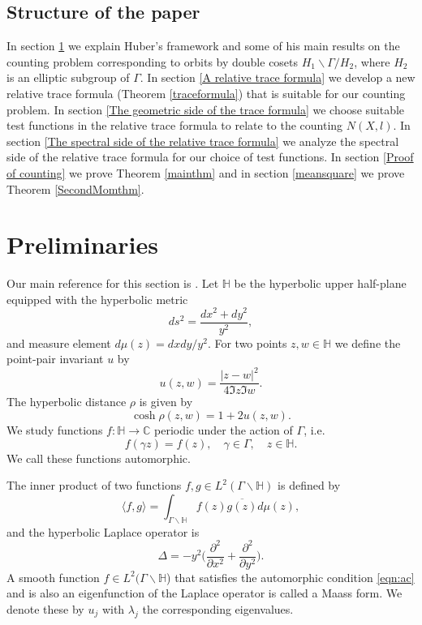\documentclass[a4paper,11pt]{amsart}
\theoremstyle{definition}
\begin{document}
\subsection{Structure of the paper}
In section \ref{Preliminaries} we explain Huber's framework and some of his main results on the counting problem corresponding to orbits by double cosets $H_1\backslash \Gamma /H_2$, where $H_2$ is an elliptic subgroup of $\Gamma$.
In section \ref{A relative trace formula} we develop a new relative trace formula (Theorem \ref{traceformula}) that is suitable for our counting problem.
In section \ref{The geometric side of the trace formula} we choose suitable test functions in the relative trace formula to relate to the counting $N(X,l)$.
In section \ref{The spectral side of the relative trace formula} we analyze the spectral side of the relative trace formula for our choice of test functions. In section \ref{Proof of counting} we prove Theorem \ref{mainthm} and in section \ref{meansquare} we prove Theorem \ref{SecondMomthm}. 

\section{Preliminaries}\label{Preliminaries}
Our main reference for this section is \cite{IW}. 
Let $\mathbb{H}$ be the hyperbolic upper half-plane 
equipped with the hyperbolic metric 
$$ds^2= \frac{dx^2+dy^2}{y^2},$$
and  measure element  
$d\mu(z)={dxdy}/{y^2}.$
For two points $z,w\in \mathbb{H}$ we define the point-pair invariant $u$ by
\begin{equation}\label{uzw}
    u(z,w)= \frac{|z-w|^2}{4\Im z\Im w}.
\end{equation}
The hyperbolic distance $\rho$ is given by
\begin{equation}\label{rho}
\cosh \rho(z,w) = 1+2u(z,w).
\end{equation}
We study functions $f : \mathbb{H} \rightarrow \mathbb{C}$ periodic under the action of $\Gamma$, i.e. 
\begin{equation}\label{eqn:ac}
f(\gamma z)= f(z),\quad \gamma \in \Gamma ,\quad z\in \mathbb{H}.
\end{equation}
We call these functions automorphic. 

The  inner product of two functions $f,g \in L^2(\Gamma \backslash \mathbb{H})$ is defined by
$$\langle f,g \rangle = \int_{\Gamma \backslash \mathbb{H}} f(z)\overline{g(z)}d\mu(z),$$
and the hyperbolic Laplace operator is 
$$ \Delta = -y^2 \Bigg( \frac{\partial^2}{\partial x^2} + \frac{\partial^2}{\partial y^2} \Bigg).$$
A smooth function $f \in L^2(\Gamma \backslash \mathbb{H}$) that satisfies the automorphic condition \eqref{eqn:ac} and is also an eigenfunction of the Laplace operator is called a Maass form. We denote these by $u_j$ with $\lambda_j$ the corresponding eigenvalues. 
\end{document}
